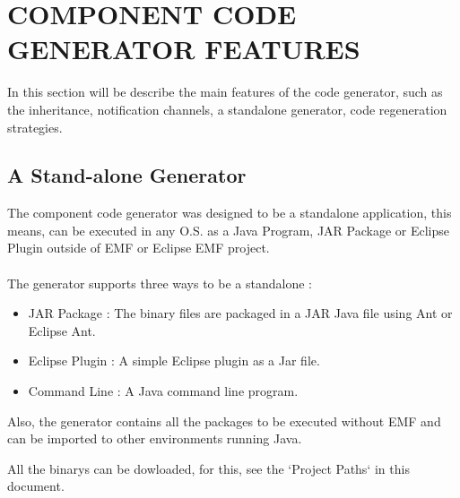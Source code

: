 \section{COMPONENT CODE GENERATOR FEATURES}

In this section will be describe the main features of the code generator, such
as the inheritance, notification channels, a standalone generator, code
regeneration strategies.

\subsection{A Stand-alone Generator}
The component code generator was designed to be a standalone application,
this means, can be executed in any O.S. as a Java Program, JAR Package or
Eclipse Plugin outside of EMF or Eclipse EMF project.\\
\\
The generator supports three ways to be a standalone :
\begin{itemize}
  \item JAR Package : The binary files are packaged in a JAR Java file using
  Ant or Eclipse Ant.
  \item Eclipse Plugin : A simple Eclipse plugin as a Jar file.
  \item Command Line : A Java command line program.
\end{itemize}
Also, the generator contains all the packages to be executed without EMF and 
can be imported to other environments running Java.

All the binarys can be dowloaded, for this, see the `Project Paths` in this
document.

\newpage

